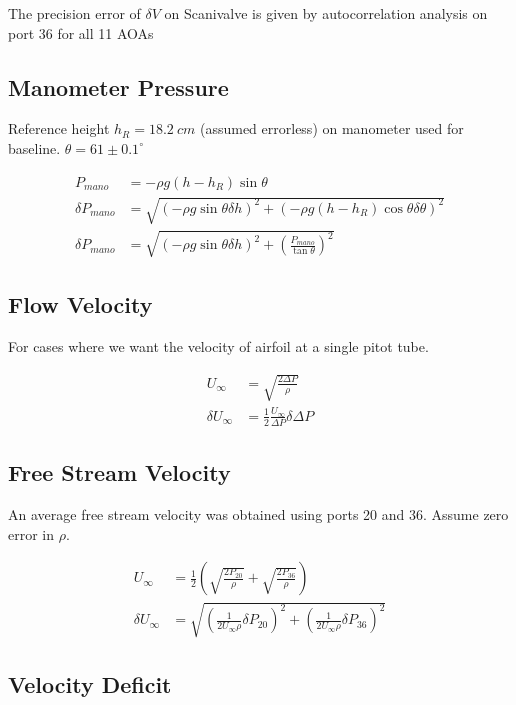 \documentclass[runningheads]{llncs}
\begin{document}
The precision error of $\delta V$ on Scanivalve is given by autocorrelation analysis on port 36 for all 11 AOAs 

\subsection{Manometer Pressure}

Reference height $h_R = 18.2 \ \si{cm}$ (assumed errorless) on manometer used for baseline. $\theta = 61 \pm 0.1^\circ$

\begin{align*}
    P_{mano} &= -\rho g (h - h_R) \sin\theta\\
    \delta P_{mano} &= \sqrt{\left(-\rho g \sin \theta \delta h\right)^2 + \left(-\rho g  (h-h_R)\cos\theta \delta \theta\right)^2}\\
    \delta P_{mano} &= \sqrt{\left(-\rho g \sin \theta \delta h\right)^2 + \left(\frac{P_{mano}}{\tan \theta}\right)^2}
\end{align*}

\subsection{Flow Velocity}

For cases where we want the velocity of airfoil at a single pitot tube.

\begin{align*}
    U_\infty &=  \sqrt{\frac{2 \Delta P}{\rho}} \\
    \delta U_\infty &= \frac{1}{2}\frac{U_\infty}{\Delta P} \delta \Delta P
\end{align*}

\subsection{Free Stream Velocity}

An average free stream velocity was obtained using ports 20 and 36. Assume zero error in $\rho$.

\begin{align*}
    U_\infty &= \frac{1}{2} \left(\sqrt{\frac{2 P_{20}}{\rho}} + \sqrt{\frac{2 P_{36}}{\rho}} \right) \\
    \delta U_\infty &= \sqrt{\left(\frac{1}{2U_\infty \rho} \delta P_{20}\right)^2 + \left(\frac{1}{2U_\infty \rho } \delta P_{36}\right)^2}
\end{align*}

\subsection{Velocity Deficit}
\end{document}
